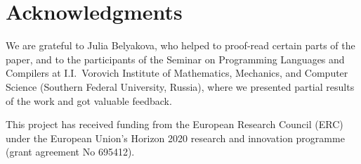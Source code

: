 \documentclass[runningheads]{llncs}
\begin{document}
\section*{Acknowledgments}
\label{sec:acks}

We are grateful to Julia Belyakova, who helped to proof-read certain parts of the paper, 
and to the participants of the Seminar on Programming Languages and Compilers at 
I.I.~Vorovich Institute of Mathematics, Mechanics, and Computer Science (Southern Federal
University, Russia), where we presented partial results of the work and got valuable feedback.

This project has received funding from the European Research Council (ERC) under the
European Union's Horizon 2020 research and innovation programme (grant agreement No 695412).

%
%
%


%
\end{document}
